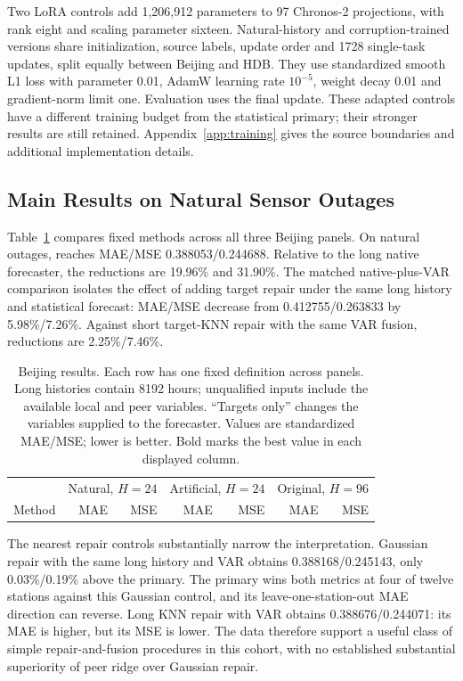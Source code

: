 Two LoRA controls add 1,206,912 parameters to 97 Chronos-2 projections, with rank eight and scaling parameter sixteen. Natural-history and corruption-trained versions share initialization, source labels, update order and 1728 single-task updates, split equally between Beijing and HDB. They use standardized smooth L1 loss with parameter 0.01, AdamW learning rate $10^{-5}$, weight decay 0.01 and gradient-norm limit one. Evaluation uses the final update. These adapted controls have a different training budget from the statistical primary; their stronger results are still retained. Appendix~\ref{app:training} gives the source boundaries and additional implementation details.

\subsection{Main Results on Natural Sensor Outages}

Table~\ref{tab:main} compares fixed methods across all three Beijing panels. On natural outages, \method{} reaches MAE/MSE 0.388053/0.244688. Relative to the long native forecaster, the reductions are 19.96\% and 31.90\%. The matched native-plus-VAR comparison isolates the effect of adding target repair under the same long history and statistical forecast: MAE/MSE decrease from 0.412755/0.263833 by 5.98\%/7.26\%. Against short target-KNN repair with the same VAR fusion, reductions are 2.25\%/7.46\%.

\begin{table}[t]
\caption{Beijing results. Each row has one fixed definition across panels. Long histories contain 8192 hours; unqualified inputs include the available local and peer variables. ``Targets only'' changes the variables supplied to the forecaster. Values are standardized MAE/MSE; lower is better. Bold marks the best value in each displayed column.}
\label{tab:main}
\centering\footnotesize
\setlength{\tabcolsep}{3.3pt}
\begin{tabular}{lrrrrrr}
\toprule
 & \multicolumn{2}{c}{Natural, $H=24$} & \multicolumn{2}{c}{Artificial, $H=24$} & \multicolumn{2}{c}{Original, $H=96$}\\
Method & MAE & MSE & MAE & MSE & MAE & MSE\\
\midrule

\end{tabular}
\end{table}

The nearest repair controls substantially narrow the interpretation. Gaussian repair with the same long history and VAR obtains 0.388168/0.245143, only 0.03\%/0.19\% above the primary. The primary wins both metrics at four of twelve stations against this Gaussian control, and its leave-one-station-out MAE direction can reverse. Long KNN repair with VAR obtains 0.388676/0.244071: its MAE is higher, but its MSE is lower. The data therefore support a useful class of simple repair-and-fusion procedures in this cohort, with no established substantial superiority of peer ridge over Gaussian repair.

